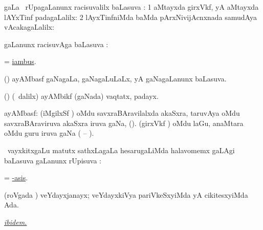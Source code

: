 \bentry
{}
\gl{\uparx}
\bmng
\nA gaLa \bava\ rUpagaLanunx racisuvalilx baLasuva \uparx: 
\bnum
\num{1}  aMtayxda girxVkf,  yA  aMtayxda lAYxTinf padagaLalilx:  
\num{2} lAyxTinfniMda baMda pArxNivijAcnxnada samudAya vAcakagaLalilx:  
\enum
\emng
\eentry

\bentry
{}
\gl{\saMkiSx}
\bmng
{} 
\emng
\eentry

\bentry
{}
\gl{\uparx}
\bmng
\gu gaLanunx racisuvAga baLasuva \uparx:  
\emng
\eentry

\bentry
{}
\gl{\nA}
\bmng
 = \hyperlink{iambus}{iambus}. 
\emng
\eentry

\bentry
{}
\gl{\gu}
\bmng
(\CaM) ayAMbasf gaNagaLa, gaNagaLuLaLx, yA gaNagaLanunx baLasuva. 
\emng
\eentry

\bentry
{}
\gl{\nA}
\bmng
(\CaM) (\sA\ \bava dalilx) ayAMbikf (gaNada) vaqtatx, padayx. 
\emng
\eentry

\bentry
{}
\gl{\nA}
\bmng
 ayAMbasf: 
\banum
{} (iMgilxSf \CaM) oMdu savxraBAravilalxda akaSxra, taruvAya oMdu savxraBAraviruva akaSxra iruva gaNa, (\eng{$\cup$}). 
 (girxVkf \CaM) oMdu laGu, anaMtara oMdu guru iruva gaNa (\eng{$\cup$} -- ). 
\eanum
\emng
\eentry

\bentry
{}
\gl{\uparx}
\bmng
\kanmu\ vayxkitxgaLu matutx sathxLagaLa hesarugaLiMda halavomemx \nA gaLAgi baLasuva \gu gaLanunx rUpisuva \uparx:  
\emng
\eentry

\bentry
{}
\gl{\uparx}
\bmng
= \hyperref{kandict_a.pdf}{A}{hyp-asis}{-asis}. 
\emng
\eentry

\bentry
{}
\gl{\saMkiSx}
\bmng
{} 
\emng
\eentry

\bentry
{}
\gl{\gu}
\bmng
(roVgada \vi) veYdayxjanayx; veYdayxkiVya pariVkeSxyiMda yA cikitesxyiMda Ada. 
\emng
\eentry

\bentry
{}
\gl{\saMkiSx}
\bmng
\hyperlink{ibidem}{\it ibidem.} 
\emng
\eentry

